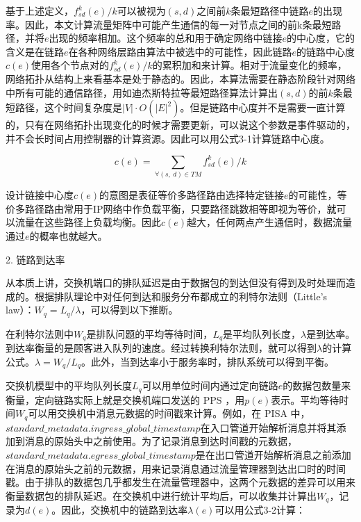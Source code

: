 基于上述定义，$f_{sd}^k(e)/k$可以被视为$(s,d)$之间前$k$条最短路径中链路$e$的出现率。因此，本文计算流量矩阵中可能产生通信的每一对节点之间的前k条最短路径，并将$e$出现的频率相加。这个频率的总和用于确定网络中链接$e$的中心度，它的含义是在链路$e$在各种网络层路由算法中被选中的可能性，因此链路$e$的链路中心度$c(e)$使用各个节点对的$f_{sd}^k(e)/k$的累积加和来计算。相对于流量变化的频率，网络拓扑从结构上来看基本是处于静态的。因此，本算法需要在静态阶段针对网络中所有可能的通信路径，用如迪杰斯特拉等最短路径算法计算出$(s,d)$的前$k$条最短路径，这个时间复杂度是$|V|\cdot O({|E|}^2)$。但是链路中心度并不是需要一直计算的，只有在网络拓扑出现变化的时候才需要更新，可以说这个参数是事件驱动的，并不会长时间占用控制器的计算资源。因此可以用公式3-1计算链路中心度。

\begin{equation} \label{link centrality}
    c\left(e\right)=\sum_{\forall(s,\ d)\in T M}{f_{sd}^k\left(e\right)}/k
\end{equation}

设计链接中心度$c(e)$的意图是表征等价多路径路由选择特定链接$e$的可能性，等价多路径路由常用于IP网络中作负载平衡，只要路径跳数相等即视为等价，就可以流量在这些路径上负载均衡。因此$c(e)$越大，任何两点产生通信时，数据流量通过$e$的概率也就越大。

2. 链路到达率

从本质上讲，交换机端口的排队延迟是由于数据包的到达但没有得到及时处理而造成的。根据排队理论中对任何到达和服务分布都成立的利特尔法则（Little's law）：$W_q=L_q/\lambda$，可以得到以下推断。

在利特尔法则中$W_q$是排队问题的平均等待时间，$L_q$是平均队列长度，$\lambda$是到达率。到达率衡量的是顾客进入队列的速度。经过转换利特尔法则，就可以得到$\lambda$的计算公式。$\lambda=W_q/L_q$。此外，当到达率小于服务率时，排队系统可以得到平衡。

交换机模型中的平均队列长度$L_q$可以用单位时间内通过定向链路$e$的数据包数量来衡量，定向链路实际上就是交换机端口发送的 \gls*{PPS} ，用$p(e)$表示。平均等待时间$W_q$可以用交换机中消息元数据的时间戳来计算。例如，在 \gls*{PISA} 中，$standard\_metadata.ingress\_global\_timestamp$在入口管道开始解析消息并将其添加到消息的原始头中之前使用。为了记录消息到达时间戳的元数据，$standard\_metadata.egress\_global\_timestamp$是在出口管道开始解析消息之前添加在消息的原始头之前的元数据，用来记录消息通过流量管理器到达出口时的时间戳。由于排队的数据包几乎都发生在流量管理器中，这两个元数据的差异可以用来衡量数据包的排队延迟。在交换机中进行统计平均后，可以收集并计算出$W_q$，记录为$d(e)$。因此，交换机中的链路到达率$\lambda(e)$可以用公式3-2计算：

